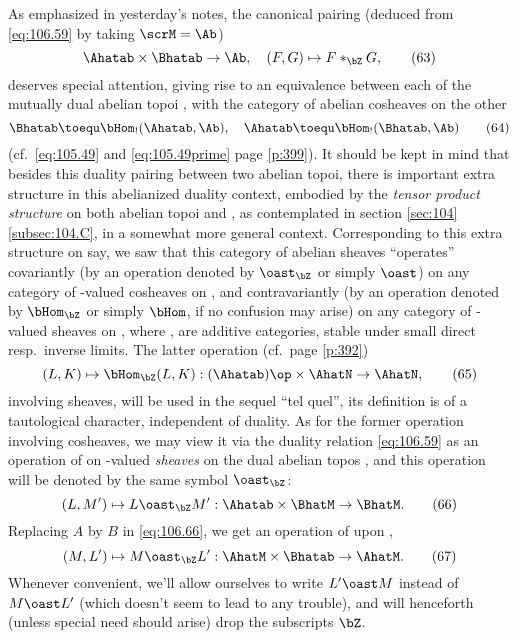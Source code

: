 As emphasized in yesterday's notes, the canonical pairing (deduced
from \eqref{eq:106.59} by taking $\scrM=\Ab$)
\begin{equation}
  \label{eq:106.63}
  \Ahatab\times\Bhatab\to\Ab,\quad
  (F,G)\mapsto F*_{\bZ} G,\tag{63}
\end{equation}
deserves special attention, giving rise to an equivalence between each
of the mutually dual abelian topoi \Ahatab, \Bhatab{} with the
category of abelian cosheaves on the other
\begin{equation}
  \label{eq:106.64}
  \Bhatab \toequ \bHom_!(\Ahatab,\Ab), \quad
  \Ahatab \toequ \bHom_!(\Bhatab,\Ab)\tag{64}
\end{equation}
(cf.\ \eqref{eq:105.49} and \eqref{eq:105.49prime} page
\ref{p:399}). It should be kept in mind that besides this duality
pairing between two abelian topoi, there is important
extra structure in this abelianized duality context,
embodied by the \emph{tensor product structure} on both abelian topoi
\Ahatab{} and \Bhatab, as contemplated in section \ref{sec:104}
\ref{subsec:104.C}, in a somewhat more general context. Corresponding
to this extra structure on \Ahatab{} say, we saw that this category of
abelian sheaves ``operates'' covariantly (by an operation denoted by
$\oast_{\bZ}$ or simply $\oast$) on any category of \scrM-valued
cosheaves on \Ahatab, and contravariantly (by an operation denoted by
$\bHom_{\bZ}$ or simply $\bHom$, if no confusion may arise) on any
category of \scrN-valued sheaves on \Ahatab, where \scrM, \scrN{} are
additive categories, stable under small direct resp.\ inverse
limits. The latter operation (cf.\ page \ref{p:392})
\begin{equation}
  \label{eq:106.65}
  (L,K) \mapsto \bHom_{\bZ}(L,K) : (\Ahatab)\op \times \AhatN \to
  \AhatN,\tag{65}
\end{equation}
involving sheaves, will be used in the sequel ``tel
quel'', its
definition is of a tautological character, independent of duality. As
for the former operation involving cosheaves, we may view it via the
duality relation \eqref{eq:106.59} as an operation of \Ahatab{} on
\scrM-valued \emph{sheaves} on the dual abelian topos \Bhatab, and
this operation will be denoted by the same symbol $\oast_{\bZ}$:
\begin{equation}
  \label{eq:106.66}
  (L,M') \mapsto L\oast_{\bZ} M' : \Ahatab \times \BhatM
  \to \BhatM.\tag{66} 
\end{equation}
Replacing $A$ by $B$ in \eqref{eq:106.66}, we get an operation of
\Bhatab{} upon \AhatM,
\begin{equation}
  \label{eq:106.67}
  (M,L') \mapsto M \oast_{\bZ} L' :
  \AhatM\times\Bhatab\to\AhatM.\tag{67}
\end{equation}
Whenever convenient, we'll allow ourselves to write $L'\oast M$
instead of $M\oast L'$ (which doesn't seem to lead to any trouble),
and will henceforth (unless special need should arise) drop the
subscripts $\bZ$.


